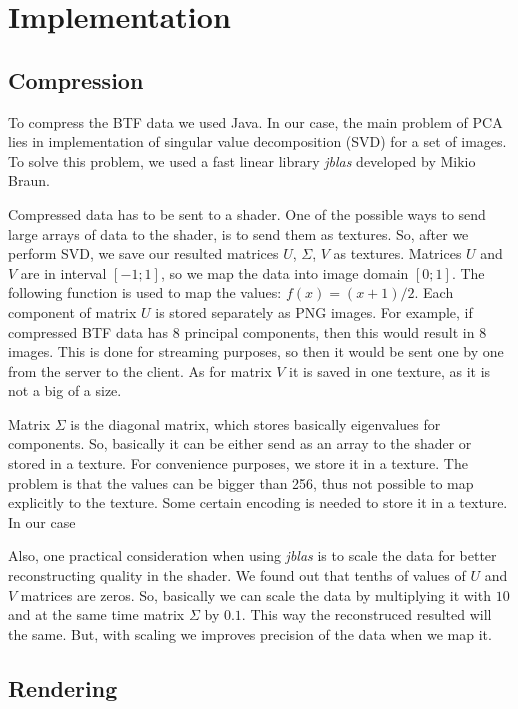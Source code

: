 \chapter{Implementation}




\section{Compression}
\label{section:impl_compression}

To compress the BTF data we used Java. In our case, the main problem of PCA lies in implementation of singular value decomposition (SVD) for a set of images.
To solve this problem, we used a fast linear library \emph{jblas} \cite{jblas} developed by Mikio Braun. 


Compressed data has to be sent to a shader. One of the possible ways to send large arrays of data to the shader, is to send them as textures. 
So, after we perform SVD, we save our resulted matrices $U$, $\Sigma$, $V$ as textures.  Matrices $U$ and $V$ are in interval $[-1;1]$, so we map the data into image domain $[0;1]$.
The following function is used to map the values:  $f(x)=(x+1)/2$.
 Each component of matrix $U$ is stored separately as PNG images. For example, if compressed BTF data has $8$ principal components, then this would result in  $8$ images.
This is done for streaming purposes, so then it would be sent one by one from the server to the client.
As for matrix $V$ it is saved in one texture, as it is not a big of a size.

 Matrix $\Sigma$ is the diagonal matrix, which stores basically eigenvalues for components. So, basically it can be either send as an array to the shader or stored in a texture.
 For convenience purposes, we store it in a texture. The problem is that the values can be bigger than 256, thus not possible to map explicitly to the texture. 
 Some certain encoding is needed to store it in a texture. In our case
 

Also, one practical consideration when using \emph{jblas} is to scale the data for better reconstructing quality in the shader. We found out that tenths of values of $U$ and $V$ matrices are zeros.
So, basically we can scale the data by multiplying it with $10$ and at the same time matrix $\Sigma$ by $0.1$. This way the reconstruced resulted will the same. But, with scaling we improves precision of the data when we map it.



\section{Rendering}
\label{section:impl_rendering}


